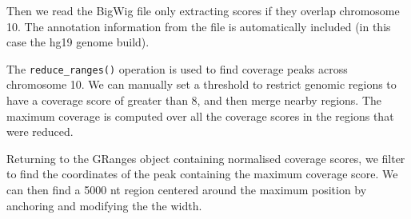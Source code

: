 \documentclass[10pt,letterpaper]{article}
\newenvironment{Shaded}{\begin{snugshade}}{\end{snugshade}}
\newcommand{\DataTypeTok}[1]{\textcolor[rgb]{0.13,0.29,0.53}{#1}}
\newcommand{\DecValTok}[1]{\textcolor[rgb]{0.00,0.00,0.81}{#1}}
\newcommand{\KeywordTok}[1]{\textcolor[rgb]{0.13,0.29,0.53}{\textbf{#1}}}
\newcommand{\NormalTok}[1]{#1}
\newcommand{\OperatorTok}[1]{\textcolor[rgb]{0.81,0.36,0.00}{\textbf{#1}}}
\newcommand{\StringTok}[1]{\textcolor[rgb]{0.31,0.60,0.02}{#1}}
\begin{document}
\begin{Shaded}
\end{Shaded}

Then we read the BigWig file only extracting scores if they overlap
chromosome 10. The annotation information from the file is automatically
included (in this case the hg19 genome build).

\begin{Shaded}
\end{Shaded}

The \texttt{reduce\_ranges()} operation is used to find coverage peaks
across chromosome 10. We can manually set a threshold to restrict
genomic regions to have a coverage score of greater than 8, and then
merge nearby regions. The maximum coverage is computed over all the
coverage scores in the regions that were reduced.

\begin{Shaded}
\end{Shaded}

Returning to the GRanges object containing normalised coverage scores,
we filter to find the coordinates of the peak containing the maximum
coverage score. We can then find a 5000 nt region centered around the
maximum position by anchoring and modifying the the width.
\end{document}
